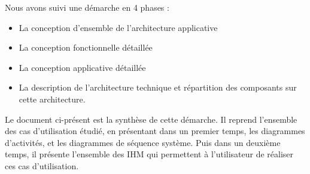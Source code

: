 Nous avons suivi une démarche en 4 phases : 
\begin{itemize}
\item La conception d’ensemble de l’architecture applicative
\item La conception fonctionnelle détaillée
\item La conception applicative détaillée
\item La description de l’architecture technique et répartition des composants sur cette
architecture.\\
\end{itemize}

Le document ci-présent est la synthèse de cette démarche. Il reprend l'ensemble des cas d'utilisation étudié, en présentant dans un premier temps, les diagrammes d'activités, et les diagrammes de séquence système. Puis dans un deuxième temps, il présente l'ensemble des IHM qui permettent à l'utilisateur de réaliser ces cas d'utilisation.












